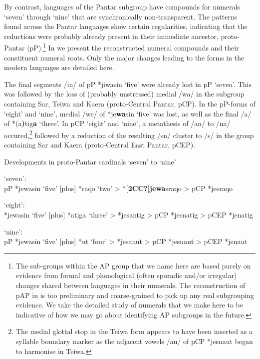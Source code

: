 \documentclass[output=paper]{LSP/langsci}
\begin{document}
By contrast, languages of the Pantar subgroup have compounds for numerals `seven' through `nine' that are synchronically non-transparent. The patterns found across the Pantar languages show certain regularities, indicating that the reductions were probably already present in their immediate ancestor, proto-Pantar (pP).\footnote{{}   The sub-groups within the AP group that we name here are based purely on evidence from formal and phonological (often sporadic and/or irregular) changes shared between languages in their numerals. The reconstruction of pAP in \citet{HoltonEtAl2012} is too preliminary and coarse-grained to pick up any real subgrouping evidence. We take the detailed study of numerals that we make here to be indicative of how we may go about identifying AP subgroups in the future.}  In  we present the reconstructed numeral compounds and their constituent numeral roots. Only the major changes leading to the forms in the modern languages are detailed here. 

  The final segments /in/ of pP *jiwasin `five' were already lost in pP `seven'. This was followed by the loss of (probably unstressed) medial /wa/ in the subgroup containing Sar, Teiwa and Kaera (proto-Central Pantar, pCP). In the pP-forms of `eight' and `nine', medial /we/ of *je\textbf{wa}sin `five' was lost, as well as the final /a/ of *(a\textbf{)}tig\textbf{a} `three'. In pCP `eight' and `nine', a metathesis of /an/ to /na/ occured,\footnote{{}   The medial glottal stop in the Teiwa form appears to have been inserted as a syllable boundary marker as the adjacent vowels /au/ of pCP *jesnaut began to harmonise in Teiwa.}  followed by a reduction of the resulting /sn/ cluster to /s/ in the group containing Sar and Kaera (proto-Central East Pantar, pCEP). 

  Developments in proto-Pantar cardinals `seven' to `nine' 

\ea%
\label{ex:6:7}
\ea
  `seven':\\
  pP *jewasin `five' [plus] *raqo `two' {\textgreater} *\textbf{[2CC?]j}\textbf{ewa}s{\textprimstress}raqo     {\textgreater}  pCP *jesraqo 

\ex  `eight':\\   
*jewasin `five' [plus] *atiga `three' {\textgreater} *je{\textprimstress}santig {\textgreater} pCP *jesnatig {\textgreater} pCEP *jenatig 

\ex  `nine': \\
pP *jewasin `five' [plus] *ut `four' {\textgreater} *je{\textprimstress}sanut  {\textgreater} pCP *jesnaut {\textgreater} pCEP *jenaut 
\z
\z
\end{document}
